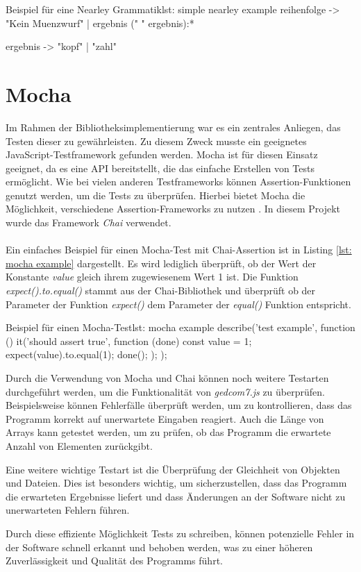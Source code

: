 {\begin{javascript}{Beispiel für eine Nearley Grammatik}{lst: simple nearley example}
	reihenfolge 
	 -> "Kein Muenzwurf" 
		| ergebnis (" " ergebnis):*
	
	ergebnis 
	 -> "kopf"
		| "zahl"
\end{javascript}}



\section{Mocha}
\label{sec: Mocha}

Im Rahmen der Bibliotheksimplementierung war es ein zentrales Anliegen, das Testen dieser zu gewährleisten.
Zu diesem Zweck musste ein geeignetes JavaScript-Testframework gefunden werden. Mocha ist für diesen Einsatz geeignet, da es eine API bereitstellt, 
die das einfache Erstellen von Tests ermöglicht. Wie bei vielen anderen Testframeworks können Assertion-Funktionen genutzt werden, um die Tests zu überprüfen. 
Hierbei bietet Mocha die Möglichkeit, verschiedene Assertion-Frameworks zu nutzen \cite{MochaDoc}. In diesem Projekt wurde das Framework \textit{Chai} verwendet. 
\\ \\
Ein einfaches Beispiel für einen Mocha-Test mit Chai-Assertion ist in Listing \ref{lst: mocha example} dargestellt. Es wird lediglich überprüft, ob der Wert der Konstante
\textit{value} gleich ihrem zugewiesenem Wert 1 ist.
Die Funktion \textit{expect().to.equal()} stammt aus der Chai-Bibliothek und überprüft ob der Parameter der Funktion \textit{expect()} dem Parameter der \textit{equal()} Funktion entspricht.
\newpage
\begin{javascript}{Beispiel für einen Mocha-Test}{lst: mocha example}
	describe('test example', function () {
		it('should assert true', function (done) {
			const value = 1;
			expect(value).to.equal(1);
			done();
		});
	});
\end{javascript}
\vspace{1em}
Durch die Verwendung von Mocha und Chai können noch weitere Testarten durchgeführt werden, um die Funktionalität 
von \textit{gedcom7.js} zu überprüfen. Beispielsweise können Fehlerfälle überprüft werden, um zu kontrollieren, 
dass das Programm korrekt auf unerwartete Eingaben reagiert. Auch die Länge von Arrays kann getestet werden, 
um zu prüfen, ob das Programm die erwartete Anzahl von Elementen zurückgibt.

Eine weitere wichtige Testart ist die Überprüfung der Gleichheit von Objekten und Dateien. Dies ist besonders 
wichtig, um sicherzustellen, dass das Programm die erwarteten Ergebnisse liefert und dass Änderungen an der 
Software nicht zu unerwarteten Fehlern führen.

Durch diese effiziente Möglichkeit Tests zu schreiben, können potenzielle Fehler in der Software schnell erkannt 
und behoben werden, was zu einer höheren Zuverlässigkeit und Qualität des Programms führt.